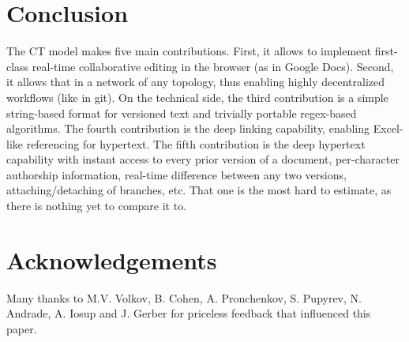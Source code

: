 \documentclass{sig-alternate}
\begin{document}
\section {Conclusion} \label{sec:conclusion}


The CT model makes five main contributions. First, it allows to implement first-class real-time collaborative editing in the browser (as in Google Docs). Second, it allows that in a network of any topology, thus enabling highly decentralized workflows (like in git). 
On the technical side, the third contribution is a simple string-based format for versioned text and trivially portable regex-based algorithms. 
The fourth contribution is the deep linking capability, enabling Excel-like referencing for hypertext.
The fifth contribution is the deep hypertext capability with instant access to every prior version of a document, per-character authorship information, real-time difference between any two versions, attaching/detaching of branches, etc.
That one is the most hard to estimate, as there is nothing yet to compare it to.


\section{Acknowledgements}

Many thanks to M.V. Volkov, B. Cohen, A. Pronchenkov, S. Pupyrev, N. Andrade, A. Iosup and J. Gerber for priceless feedback that influenced this paper. 

\small

\end{document}
